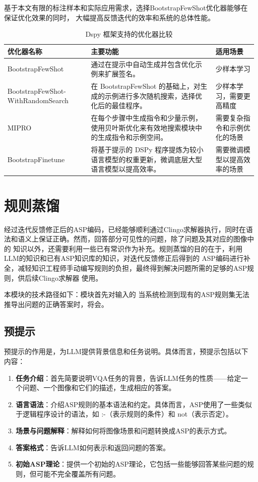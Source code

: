 基于本文有限的标注样本和实际应用需求，选择BootstrapFewShot优化器能够在保证优化效果的同时，
大幅提高反馈迭代的效率和系统的总体性能。
\begin{table}[htbp]
\centering
\caption{Dspy 框架支持的优化器比较}
\label{tab:optimizer_comparison}
\begin{tabular}{|>{\raggedright}p{4cm}|>{\raggedright}p{8cm}|>{\raggedright\arraybackslash}p{4cm}|}
\hline
\textbf{优化器名称} & \textbf{主要功能} & \textbf{适用场景} \\
\hline
BootstrapFewShot & 通过在提示中自动生成并包含优化示例来扩展签名。 & 少样本学习 \\
\hline
BootstrapFewShot-
WithRandomSearch & 在 BootstrapFewShot 的基础上，对生成的示例进行多次随机搜索，选择优化后的最佳程序。 & 少样本学习，需要更高精度 \\
\hline
MIPRO & 在每个步骤中生成指令和少量示例，使用贝叶斯优化来有效地搜索模块中的生成指令和示例空间。 & 需要复杂指令和示例优化的场景 \\
\hline
BootstrapFinetune & 将基于提示的 DSPy 程序提炼为较小语言模型的权重更新，微调底层大型语言模型以提高效率。 & 需要微调模型以提高效率的场景 \\
\hline
\end{tabular}
\end{table}
\section{规则蒸馏}
经过迭代反馈修正后的ASP编码，已经能够顺利通过Clingo求解器执行，同时在语法和语义上保证正确。然而，回答部分可见性的问题，除了问题及其对应的图像中的
知识以外，还需要利用一些已有常识作为补充。规则蒸馏的目的在于，利用LLM的知识和已有ASP知识库的知识，对迭代反馈修正后得到的
ASP编码进行补全，减轻知识工程师手动编写规则的负担，最终得到解决问题所需的足够的ASP规则，供后续Clingo求解器
使用。

本模块的技术路径如下：模块首先对输入的
当系统检测到现有的ASP规则集无法推导出问题的正确答案时，将会。
\subsection{预提示}
预提示的作用是，为LLM提供背景信息和任务说明。具体而言，预提示包括以下内容：
\begin{enumerate}[itemsep=0pt,parsep=0pt]
\item \textbf{任务介绍}：首先简要说明VQA任务的背景，告诉LLM任务的性质——给定一个问题、一个图像和它们的描述，生成相应的答案。
\item \textbf{语言语法}：介绍ASP规则的基本语法和约定。具体而言，ASP使用了一些类似于逻辑程序设计的语法，如 :-（表示规则的条件）和 not（表示否定）。
\item \textbf{场景与问题解释}：解释如何将图像场景和问题转换成ASP的表示方式。
\item \textbf{答案格式}：告诉LLM如何表示和返回问题的答案。
\item \textbf{初始ASP理论}：提供一个初始的ASP理论，它包括一些能够回答某些问题的规则，但可能不完全覆盖所有问题。
\end{enumerate}

